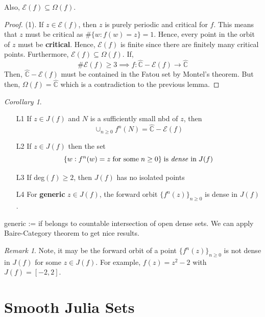 \documentclass[a4paper, 11pt]{book}
\theoremstyle{definition}
\theoremstyle{remark}
\newtheorem*{remark}{Remark}
\newtheorem{corollary}{Corollary}[theorem]
\begin{document}
    Also, $\mathcal{E}(f)\subseteq \Omega(f)$.

    \begin{proof}
        (1). If $z\in\mathcal{E}(f)$, then $z$ is purely periodic and critical for $f$. This means that $z$ must be critical as $\#\{w:f(w)=z\}=1$.
        Hence, every point in the orbit of $z$ must be \textbf{critical}. Hence, $\mathcal{E}(f)$ is finite since there are finitely many critical
        points. Furthermore, $\mathcal{E}(f)\subseteq\Omega(f)$. If,
        \[ \#\mathcal{E}(f)\geq 3 \implies f:\hat{\mathbb{C}}-\mathcal{E}(f)\to\hat{\mathbb{C}} \]
        Then, $\hat{\mathbb{C}}-\mathcal{E}(f)$ must be contained in the Fatou set by Montel's theorem. But then, $\Omega(f) = \hat{\mathbb{C}}$ which
        is a contradiction to the previous lemma.
    \end{proof}

    \begin{corollary}
        \begin{enumerate}
            \item[L1] If $z\in J(f)$ and $N$ is a sufficiently small nbd of $z$, then
                \[ \cup_{n\geq 0} f^n(N) = \hat{\mathbb{C}}-\mathcal{E}(f) \]
            \item[L2] If $z\in J(f)$ then the set
                \[ \{w: f^n(w)=z\;\text{for some}\;n\geq 0\}\;\text{is \textit{dense} in}\;J(f) \]
            \item[L3] If deg$(f)\geq 2$, then $J(f)$ has no isolated points
            \item[L4] For \textbf{generic} $z\in J(f)$, the forward orbit $\{f^n(z)\}_{n\geq 0}$ is dense in $J(f)$.
        \end{enumerate}
    \end{corollary}

    generic := if belongs to countable intersection of open dense sets. We can apply Baire-Category theorem to get nice results.\\

    \begin{remark}
        Note, it may be the forward orbit of a point $\{f^n(z)\}_{n\geq 0}$ is not dense in $J(f)$ for some $z\in J(f)$. For example,
        $f(z) = z^2 - 2$ with $J(f) = [-2,2]$.
    \end{remark}

    \section{Smooth Julia Sets}
\end{document}
